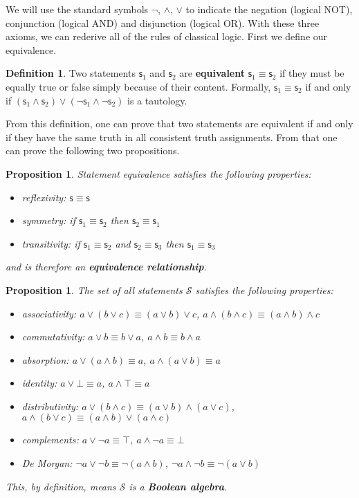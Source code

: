 \documentclass[letterpaper]{article}
\theoremstyle{plain}%
\newtheorem{prop}[thrm]{Proposition}
\theoremstyle{definition}
\newtheorem{defn}[thrm]{Definition}
\theoremstyle{remark}
\numberwithin{equation}{section}
\def\tautology{\top}
\def\contradiction{\bot}
\def\AND{\wedge}
\def\OR{\vee}
\def\NOT{\neg}
\newcommand{\stmt}[1][s] {\mathsf{#1}}
\begin{document}
We will use the standard symbols $\NOT$, $\AND$, $\OR$ to indicate the negation (logical NOT), conjunction (logical AND) and disjunction (logical OR). With these three axioms, we can rederive all of the rules of classical logic. First we define our equivalence.

\begin{defn}
	Two statements $\stmt_1$ and $\stmt_2$ are \textbf{equivalent} $\stmt_1 \equiv \stmt_2$ if they must be equally true or false simply because of their content. Formally, $\stmt_1 \equiv \stmt_2$ if and only if $(\stmt_1 \AND \stmt_2) \OR (\NOT\stmt_1 \AND \NOT\stmt_2)$ is a tautology.
\end{defn}

From this definition, one can prove that two statements are equivalent if and only if they have the same truth in all consistent truth assignments. From that one can prove the following two propositions.

\begin{prop}
	Statement equivalence satisfies the following properties:
	\begin{itemize}
		\item reflexivity: $\stmt \equiv \stmt$
		\item symmetry: if $\stmt_1 \equiv \stmt_2$ then $\stmt_2 \equiv \stmt_1$
		\item transitivity: if $\stmt_1 \equiv \stmt_2$ and $\stmt_2 \equiv \stmt_3$ then $\stmt_1 \equiv \stmt_3$
	\end{itemize}
	and is therefore an \textbf{equivalence relationship}.
\end{prop}

\begin{prop}\label{boolean_properties}
	The set of all statements $\mathcal{S}$ satisfies the following properties:
	\begin{itemize}
		\item associativity: $a \OR (b \OR c) \equiv (a \OR b) \OR c$, $a \AND (b \AND c) \equiv (a \AND b) \AND c$
		\item commutativity: $a \OR b \equiv b \OR a$, $a \AND b \equiv b \AND a$
		\item absorption: $a \OR (a \AND b) \equiv a$, $a \AND (a \OR b) \equiv a$
		\item identity: $a \OR \contradiction \equiv a
		$, $a \AND \tautology \equiv a$
		\item distributivity: $a \OR (b \AND c) \equiv (a \OR b) \AND (a \OR c)$, $a \AND (b \OR c) \equiv (a \AND b) \OR (a \AND c)$
		\item complements: $a \OR \NOT a \equiv \tautology$, $a \AND \NOT a \equiv \contradiction$
		\item De Morgan: $\NOT a \OR \NOT b \equiv \NOT (a \AND b)$, $\NOT a \AND \NOT b \equiv \NOT (a \OR b)$
	\end{itemize}
	This, by definition, means $\mathcal{S}$ is a \textbf{Boolean algebra}.
\end{prop}
\end{document}
